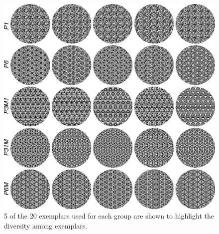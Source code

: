 \documentclass[11pt, twoside]{article}
\begin{document}
\begin{figure}[H]
	\centering
	\includegraphics[width=\linewidth]{./figures//wpg_exemplars.pdf}
	\caption{5 of the 20 exemplars used for each group are shown to highlight the diversity among exemplars.}
	\label{fig:wpg_exemplars}
\end{figure}
\end{document}
